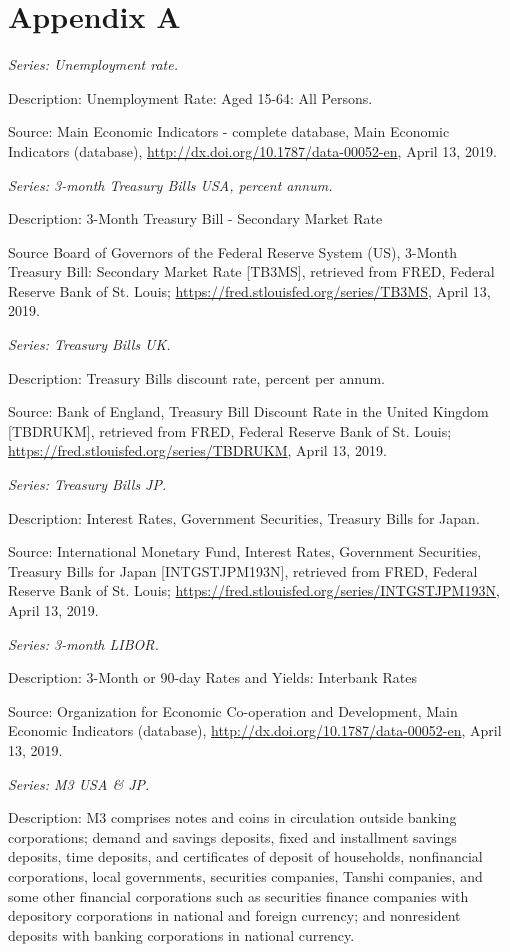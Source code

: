 
\section{Appendix A}
\label{app:A}

\textit{Series: Unemployment rate.}

Description: Unemployment Rate: Aged 15-64: All Persons.

Source: Main Economic Indicators - complete database, Main Economic Indicators (database),  \url{http://dx.doi.org/10.1787/data-00052-en}, April 13, 2019.

\textit{Series: 3-month Treasury Bills USA, percent annum.}

Description: 3-Month Treasury Bill - Secondary Market Rate 

Source Board of Governors of the Federal Reserve System (US), 3-Month Treasury Bill: Secondary Market Rate [TB3MS], retrieved from FRED, Federal Reserve Bank of St. Louis; \url{https://fred.stlouisfed.org/series/TB3MS}, April 13, 2019.


\textit{Series: Treasury Bills UK.}

Description: Treasury Bills discount rate, percent per annum.

Source: Bank of England, Treasury Bill Discount Rate in the United Kingdom [TBDRUKM], retrieved from FRED, Federal Reserve Bank of St. Louis; \url{https://fred.stlouisfed.org/series/TBDRUKM}, April 13, 2019.


\textit{Series: Treasury Bills JP.}

Description: Interest Rates, Government Securities, Treasury Bills for Japan.

Source: International Monetary Fund, Interest Rates, Government Securities, Treasury Bills for Japan [INTGSTJPM193N], retrieved from FRED, Federal Reserve Bank of St. Louis; \url{https://fred.stlouisfed.org/series/INTGSTJPM193N}, April 13, 2019.

\textit{Series: 3-month LIBOR.}

Description: 3-Month or 90-day Rates and Yields: Interbank Rates

Source: Organization for Economic Co-operation and Development, Main Economic Indicators (database), \url{http://dx.doi.org/10.1787/data-00052-en}, April 13, 2019.

\textit{Series: M3 USA \& JP.}

Description: M3 comprises notes and coins in circulation outside banking corporations; demand and savings deposits, fixed and installment savings deposits, time deposits, and certificates of deposit of households, nonfinancial corporations, local governments, securities companies, Tanshi companies, and some other financial corporations such as securities finance companies with depository corporations in national and foreign currency; and nonresident deposits with banking corporations in national currency. 

